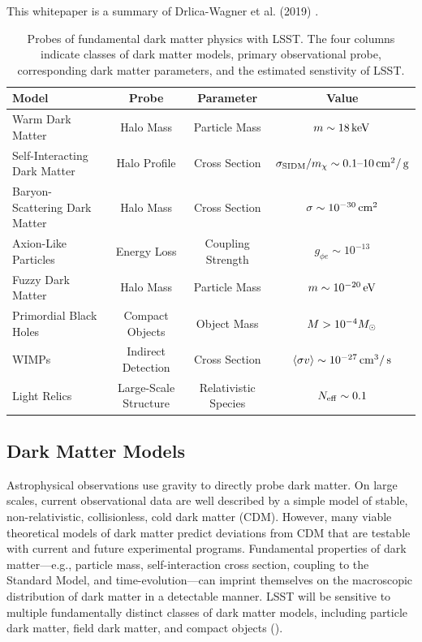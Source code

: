 \documentclass[12pt]{article}
\begin{document}
This whitepaper is a summary of Drlica-Wagner et al. (2019) \citep{drlica-wagner_2019_lsst_dark_matter}.

\begin{table}[ht]
\footnotesize
\begin{center}
\begin{tabular}{l c c c}
\hline 
Model & Probe & Parameter & Value \\
\hline 
\hline
Warm Dark Matter  & Halo Mass & Particle Mass & $m \sim 18 \mathrm{\,keV}$ \\
Self-Interacting Dark Matter & Halo Profile & Cross Section & $\sigma_{\rm SIDM}/m_\chi \sim 0.1\text{--}10\mathrm{\,cm}^2/\mathrm{\,g}$ \\
Baryon-Scattering Dark Matter & Halo Mass & Cross Section & $\sigma \sim 10^{-30} \mathrm{\,cm}^2$ \\
Axion-Like Particles & Energy Loss & Coupling Strength & $g_{\phi e} \sim 10^{-13} $ \\
Fuzzy Dark Matter & Halo Mass & Particle Mass & $m \sim 10^{-20} \mathrm{\,eV}$  \\
Primordial Black Holes  & Compact Objects & Object Mass & $M > 10^{-4} M_\odot$ \\
WIMPs & Indirect Detection & Cross Section & $\langle \sigma v \rangle \sim 10^{-27} \mathrm{\,cm}^3/\mathrm{\,s}$ \\
Light Relics & Large-Scale Structure & Relativistic Species & $N_{\rm eff} \sim 0.1$ \\[+0.5em]
\hline
\end{tabular}
\end{center}
\caption{\label{tab:models} Probes of fundamental dark matter physics with LSST. The four columns indicate classes of dark matter models, primary observational probe, corresponding dark matter parameters, and the estimated senstivity of LSST.}
\end{table}

\subsection*{Dark Matter Models}

Astrophysical observations use gravity to directly probe dark matter. 
On large scales, current observational data are well described by a simple model of stable, non-relativistic, collisionless, cold dark matter (CDM).
However, many viable theoretical models of dark matter predict deviations from CDM that are testable with current and future experimental programs.
Fundamental properties of dark matter---e.g., particle mass, self-interaction cross section, coupling to the Standard Model, and time-evolution---can imprint themselves on the macroscopic distribution of dark matter in a detectable manner. LSST will be sensitive to multiple fundamentally distinct classes of dark matter models, including particle dark matter, field dark matter, and compact objects ().
\end{document}
